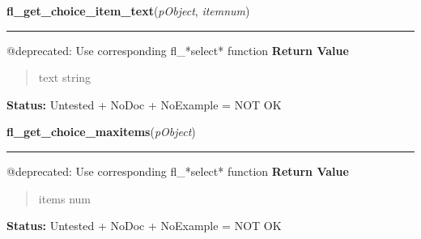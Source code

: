     \label{xformslib:deprecated:fl_get_choice_item_text}

    \vspace{0.5ex}

\hspace{.8\funcindent}\begin{boxedminipage}{\funcwidth}

    \raggedright \textbf{fl\_get\_choice\_item\_text}(\textit{pObject}, \textit{itemnum})

    \vspace{-1.5ex}

    \rule{\textwidth}{0.5\fboxrule}
\setlength{\parskip}{2ex}

@deprecated: Use corresponding fl\_*select* function
\setlength{\parskip}{1ex}
      \textbf{Return Value}
    \vspace{-1ex}

      \begin{quote}

text string
      \end{quote}

\textbf{Status:} 
Untested + NoDoc + NoExample = NOT OK


    \end{boxedminipage}

    \label{xformslib:deprecated:fl_get_choice_maxitems}

    \vspace{0.5ex}

\hspace{.8\funcindent}\begin{boxedminipage}{\funcwidth}

    \raggedright \textbf{fl\_get\_choice\_maxitems}(\textit{pObject})

    \vspace{-1.5ex}

    \rule{\textwidth}{0.5\fboxrule}
\setlength{\parskip}{2ex}

@deprecated: Use corresponding fl\_*select* function
\setlength{\parskip}{1ex}
      \textbf{Return Value}
    \vspace{-1ex}

      \begin{quote}

items num
      \end{quote}

\textbf{Status:} 
Untested + NoDoc + NoExample = NOT OK


    \end{boxedminipage}

